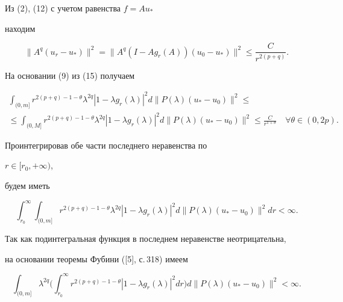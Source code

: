 \begin{pf} 


Из (2), (12) с учетом равенства $f=A u_*$ 


находим 


\begin{equation} 


\|A^q(u_r-u_*)\|^2=\|A^q(I-A g_r(A))(u_0-u_*)\|^2 


\le\frac{C}{r^{2(p+q)}}. 


\end{equation} 


На основании (9) из (15) получаем 


\begin{multline*} 


\int_{(0,m]}r^{2(p+q)-1-\theta}\lambda^{2q} 


|1-\lambda g_r(\lambda)|^2 d\|P(\lambda)(u_*-u_0)\|^2\le \\


%


\le \int_{(0,M]}r^{2(p+q)-1-\theta}\lambda^{2q} 


|1-\lambda g_r(\lambda)|^2 d\|P(\lambda)(u_*-u_0)\|^2 


\le\frac{C}{r^{1+\theta}} 


\quad \forall \theta\in(0,2p). 


\end{multline*} 


Проинтегрировав обе части последнего неравенства по 


$r\in[r_0,+\infty)$, 


будем иметь 


$$ 


\int^\infty_{r_0}\int_{(0,m]}r^{2(p+q)-1-\theta} 


\lambda^{2q}|1-\lambda g_r(\lambda)|^2 


d\|P(\lambda)(u_*-u_0)\|^2d r<\infty. 


$$ 


Так как подинтегральная функция в последнем неравенстве неотрицательна, 


на основании теоремы Фубини ([5], с.\,318) имеем 


\begin{equation} 


\int_{(0,m]}\lambda^{2q}\bigg(\int^\infty_{r_0} 


r^{2(p+q)-1-\theta}|1-\lambda g_r(\lambda)|^2d r\bigg) 


d\|P(\lambda)(u_*-u_0)\|^2<\infty. 



\end{equation}
\end{pf}
